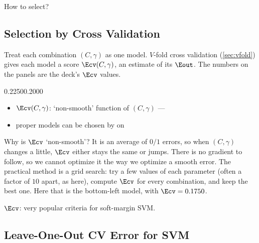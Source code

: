 \begin{moral}
    How to select? 
\end{moral}

\subsection{Selection by Cross Validation}

Treat each combination \((C, \gamma)\) as one model. \(V\)-fold cross
validation (\autoref{sec:vfold}) gives each model a score \(\Ecv(C,
\gamma)\), an estimate of its \(\Eout\). The numbers on the panels are the
deck's \(\Ecv\) values.

\begin{center}
    \begin{minipage}[c]{0.56\textwidth}
        \centering
            {}{0.2250}{0.2000}
    \end{minipage}%
    \hfill
    \begin{minipage}[c]{0.4\textwidth}
        \begin{itemize}
            \item \(\Ecv(C, \gamma)\): `non-smooth' function of \((C,
                \gamma)\) --- 
            \item proper models can be chosen by  on 
        \end{itemize}
    \end{minipage}
\end{center}

Why is \(\Ecv\) `non-smooth'? It is an average of \(0/1\) errors, so when
\((C, \gamma)\) changes a little, \(\Ecv\) either stays the same or jumps.
There is no gradient to follow, so we cannot optimize it the way we optimize
a smooth error. The practical method is a grid search: try a few values of
each parameter (often a factor of \(10\) apart, as here), compute \(\Ecv\)
for every combination, and keep the best one. Here that is the bottom-left
model, with \(\Ecv = 0.1750\).

\begin{moral}
    \(\Ecv\): very popular criteria for soft-margin SVM.
\end{moral}

\subsection{Leave-One-Out CV Error for SVM}

